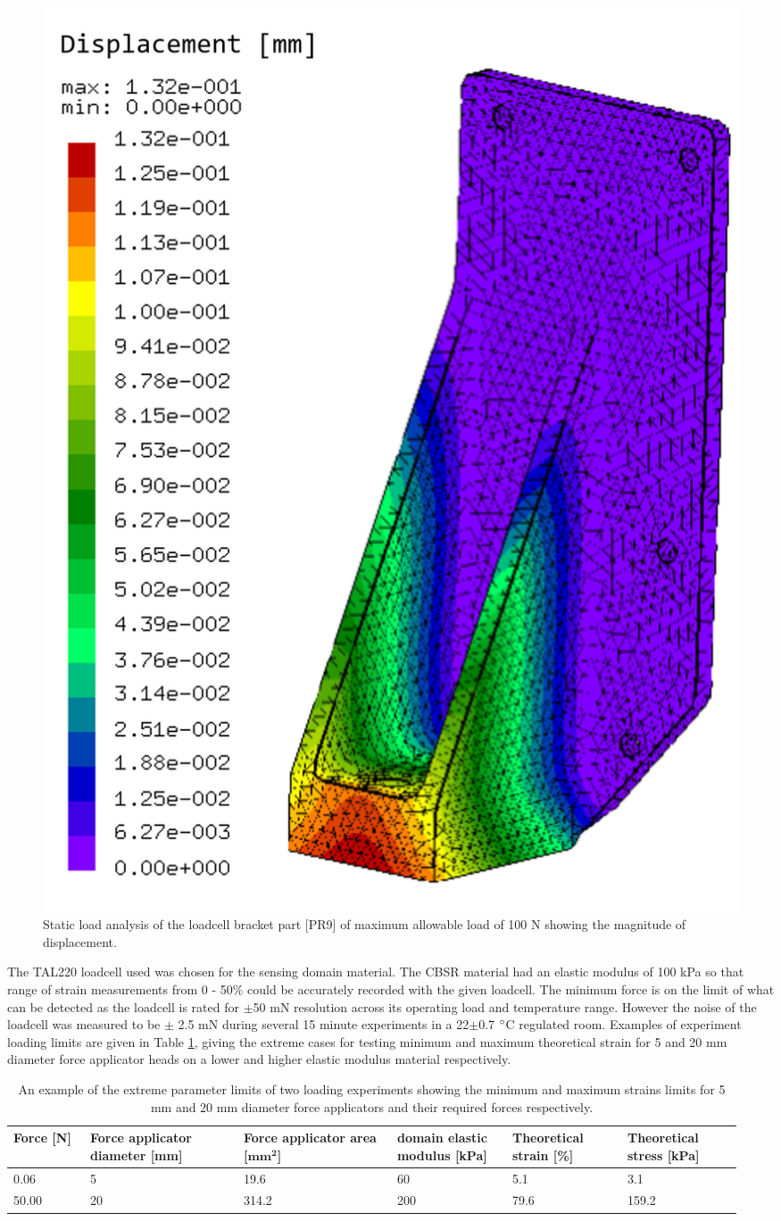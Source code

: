 \begin{figure}[H]
\centering
\includegraphics[width=0.45\linewidth]{Figures/fea_ccx_loadcell_bracket.png}
\caption{Static load analysis of the loadcell bracket part [PR9] of maximum allowable load of 100 N showing the magnitude of displacement. }
\label{fig:FEA_force_aplc}
\end{figure}

The TAL220 loadcell used was chosen for the sensing domain material. The CBSR material had an elastic modulus of 100 kPa\cite{Ellingham2024} so that range of strain measurements from 0 - 50\% could be accurately recorded with the given loadcell. The minimum force is on the limit of what can be detected as the loadcell is rated for $\pm$50 mN resolution \cite{HTCSensor2024} across its operating load and temperature range. However the noise of the loadcell was measured to be $\pm$ 2.5 mN during several 15 minute experiments in a 22$\pm$0.7 $\degree$C regulated room. Examples of experiment loading limits are given in Table \ref{tab:cfa_limits}, giving the extreme cases for testing minimum and maximum theoretical strain for 5 and 20 mm diameter force applicator heads on a lower and higher elastic modulus material respectively.
\begin{table}[H]
\hspace{-1cm}
\caption{An example of the extreme parameter limits of two loading experiments showing the minimum and maximum strains limits for 5 mm and 20 mm diameter force applicators and their required forces respectively.}
\label{tab:cfa_limits}

\hspace{-1cm}
\begin{tabular}{|p{0.1\linewidth}|p{0.2\linewidth}|p{0.2\linewidth}|p{0.15\linewidth}|p{0.15\linewidth}|p{0.15\linewidth}|} \hline
	\textbf{Force [N]} &
	\textbf{Force applicator diameter [mm]} &
	\textbf{Force applicator area [$\mathbf{mm^2}$]} &
	\textbf{domain elastic modulus [kPa]} &
	\textbf{Theoretical strain [\%]} &
	\textbf{Theoretical stress [kPa]} \\ \hline
	0.06 &
	5 &
	19.6 &
	60 &
	5.1 &
	3.1 \\ \hline
	50.00 &
	20 &
	314.2 &
	200 &
	79.6 &
	159.2 \\ \hline
\end{tabular}
\end{table}

